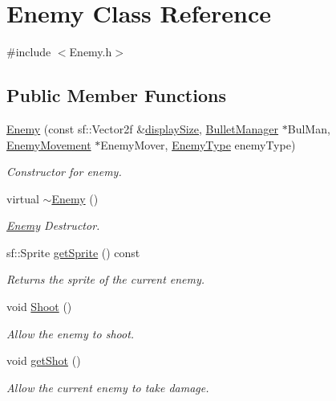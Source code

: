 \hypertarget{class_enemy}{}\section{Enemy Class Reference}
\label{class_enemy}


{\ttfamily \#include $<$Enemy.\+h$>$}

\subsection*{Public Member Functions}
\begin{DoxyCompactItemize}
\item 
\hyperlink{class_enemy_aad76aec6e71a26cff30fd4bb1d5323d2}{Enemy} (const sf\+::\+Vector2f \&\hyperlink{_game_tests_8cpp_ac0230399c621da4679687e37351dba76}{display\+Size}, \hyperlink{class_bullet_manager}{Bullet\+Manager} $\ast$Bul\+Man, \hyperlink{class_enemy_movement}{Enemy\+Movement} $\ast$Enemy\+Mover, \hyperlink{_enemy_8h_ac3e413a86119db4b031458c7259e268e}{Enemy\+Type} enemy\+Type)
\begin{DoxyCompactList}\small\item\em Constructor for enemy. \end{DoxyCompactList}\item 
virtual \hyperlink{class_enemy_ac0eec4755e28c02688065f9657150ac3}{$\sim$\+Enemy} ()
\begin{DoxyCompactList}\small\item\em \hyperlink{class_enemy}{Enemy} Destructor. \end{DoxyCompactList}\item 
sf\+::\+Sprite \hyperlink{class_enemy_a8f769acc8f473846d11eaabf504a1089}{get\+Sprite} () const
\begin{DoxyCompactList}\small\item\em Returns the sprite of the current enemy. \end{DoxyCompactList}\item 
void \hyperlink{class_enemy_ab526cfaf13910e15ca1e5e84ef230dd1}{Shoot} ()
\begin{DoxyCompactList}\small\item\em Allow the enemy to shoot. \end{DoxyCompactList}\item 
void \hyperlink{class_enemy_a2faee7be0abbf8d473ecd6d7ee084e60}{get\+Shot} ()
\begin{DoxyCompactList}\small\item\em Allow the current enemy to take damage. \end{DoxyCompactList}\item 

\end{DoxyCompactItemize}
